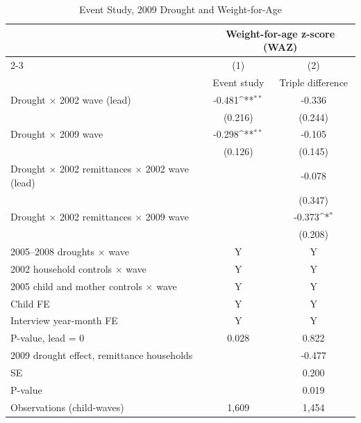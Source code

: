 \documentclass[12pt]{article}
\def\sym#1{\ifmmode^{#1}\else\(^{#1}\)\fi}
\begin{document}
\begin{longtable}{l*{2}{c}}
\caption{Event Study, 2009 Drought and Weight-for-Age}\\
\toprule
 & \multicolumn{2}{c}{Weight-for-age z-score (WAZ)}\\
\cmidrule(lr){2-3}
            &\multicolumn{1}{c}{(1)}&\multicolumn{1}{c}{(2)}\\
            &\multicolumn{1}{c}{Event study}&\multicolumn{1}{c}{Triple difference}\\
\midrule
Drought \ensuremath{\times} 2002 wave (lead)&      -0.481\sym{**} &      -0.336         \\
            &     (0.216)         &     (0.244)         \\
Drought \ensuremath{\times} 2009 wave&      -0.298\sym{**} &      -0.105         \\
            &     (0.126)         &     (0.145)         \\
Drought \ensuremath{\times} 2002 remittances \ensuremath{\times} 2002 wave (lead)&                     &      -0.078         \\
            &                     &     (0.347)         \\
Drought \ensuremath{\times} 2002 remittances \ensuremath{\times} 2009 wave&                     &      -0.373\sym{*}  \\
            &                     &     (0.208)         \\
\midrule
2005--2008 droughts \ensuremath{\times} wave&           Y         &           Y         \\
2002 household controls \ensuremath{\times} wave&           Y         &           Y         \\
2005 child and mother controls \ensuremath{\times} wave&           Y         &           Y         \\
Child FE    &           Y         &           Y         \\
Interview year-month FE&           Y         &           Y         \\
P-value, lead = 0&       0.028         &       0.822         \\
\midrule 2009 drought effect, remittance households&                     &      -0.477         \\
\quad SE    &                     &       0.200         \\
\quad P-value&                     &       0.019         \\
\midrule Observations (child-waves)&       1,609         &       1,454         \\

\end{longtable}
\end{document}
